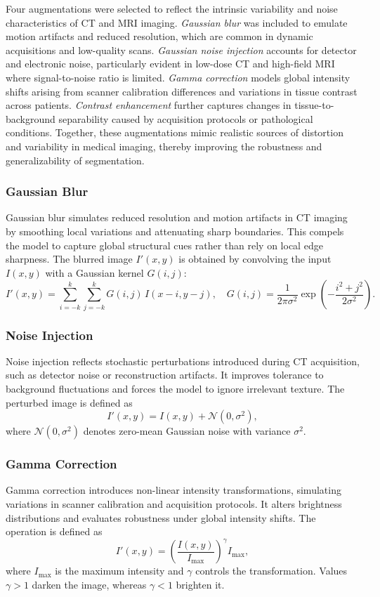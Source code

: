 \documentclass{article}
\begin{document}
Four augmentations were selected to reflect the intrinsic variability and noise characteristics of CT and MRI imaging. \textit{Gaussian blur} was included to emulate motion artifacts and reduced resolution, which are common in dynamic acquisitions and low-quality scans. \textit{Gaussian noise injection} accounts for detector and electronic noise, particularly evident in low-dose CT and high-field MRI where signal-to-noise ratio is limited. \textit{Gamma correction} models global intensity shifts arising from scanner calibration differences and variations in tissue contrast across patients. \textit{Contrast enhancement} further captures changes in tissue-to-background separability caused by acquisition protocols or pathological conditions. Together, these augmentations mimic realistic sources of distortion and variability in medical imaging, thereby improving the robustness and generalizability of segmentation.

\subsubsection{Gaussian Blur}
Gaussian blur \cite{lopes2019improving} simulates reduced resolution and motion artifacts in CT imaging by smoothing local variations and attenuating sharp boundaries. This compels the model to capture global structural cues rather than rely on local edge sharpness. The blurred image $I'(x,y)$ is obtained by convolving the input $I(x,y)$ with a Gaussian kernel $G(i,j)$:
\[
I'(x,y) = \sum_{i=-k}^{k}\sum_{j=-k}^{k} G(i,j)\,I(x-i,y-j), \quad 
G(i,j) = \frac{1}{2\pi\sigma^2}\exp\!\left(-\frac{i^2+j^2}{2\sigma^2}\right).
\]

\subsubsection{Noise Injection}
Noise injection \cite{erichson2022noisymix} reflects stochastic perturbations introduced during CT acquisition, such as detector noise or reconstruction artifacts. It improves tolerance to background fluctuations and forces the model to ignore irrelevant texture. The perturbed image is defined as
\[
I'(x,y) = I(x,y) + \mathcal{N}(0,\sigma^2),
\]
where $\mathcal{N}(0,\sigma^2)$ denotes zero-mean Gaussian noise with variance $\sigma^2$.

\subsubsection{Gamma Correction}
Gamma correction \cite{kallel2018ct} introduces non-linear intensity transformations, simulating variations in scanner calibration and acquisition protocols. It alters brightness distributions and evaluates robustness under global intensity shifts. The operation is defined as
\[
I'(x,y) = \left(\frac{I(x,y)}{I_{\max}}\right)^\gamma I_{\max},
\]
where $I_{\max}$ is the maximum intensity and $\gamma$ controls the transformation. Values $\gamma>1$ darken the image, whereas $\gamma<1$ brighten it.
\end{document}
